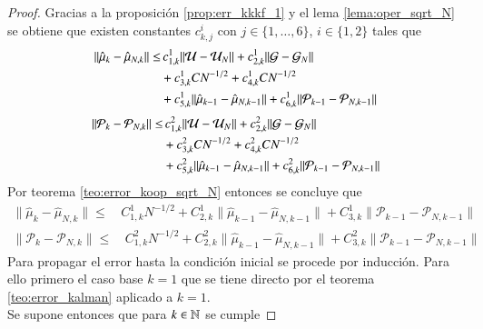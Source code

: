 \begin{proof}
	Gracias a la proposición \ref{prop:err_kkkf_1} y el lema \ref{lema:oper_sqrt_N} se obtiene que existen constantes $c_{k,j}^i$ con $j \in \{ 1, \dots, 6\}$, $i \in \{ 1, 2\}$ tales que
	\begin{equation*}
		\begin{aligned}
			\| \hat \mu_{k} - \hat \mu_{N,k}  \| \leq & \, c_{1,k}^1 \| \mathcal{U} - \mathcal{U}_N \| +  c_{2,k}^1 \| \mathcal{G} - \mathcal{G}_N \| \\ 
			&+ c_{3,k}^1 C N^{-1/2}+c_{4,k}^1 C N^{-1/2} \\
			& + c_{5,k}^1 \| \hat \mu_{k-1} - \hat \mu_{N, k-1} \| + c_{6,k}^1 \| \mathcal{P}_{k-1} - \mathcal{P}_{N, k-1} \|
		\end{aligned}
		\label{}
	\end{equation*}
	\begin{equation*}
		\begin{aligned}
			\| \mathcal{P}_{k} - \mathcal{P}_{N,k} \| \leq & \, c_{1,k}^2 \| \mathcal{U} - \mathcal{U}_N \| +  c_{2,k}^2 \| \mathcal{G} - \mathcal{G}_N \| \\ 
			&+ c_{3,k}^2 C N^{-1/2}+c_{4,k}^2 C N^{-1/2} \\
			& + c_{5,k}^2 \| \hat \mu_{k-1} - \hat \mu_{N, k-1} \| + c_{6,k}^2 \| \mathcal{P}_{k-1} - \mathcal{P}_{N, k-1} \|
		\end{aligned}
	\end{equation*}
	Por teorema \ref{teo:error_koop_sqrt_N} entonces se concluye que
	\begin{equation*}
		\begin{aligned}
			\| \hat \mu_{k} - \hat \mu_{N,k}  \| \leq & \, C_{1,k}^1 N^{-1/2} + C_{2,k}^1 \| \hat \mu_{k-1} - \hat \mu_{N, k-1} \| + C_{3,k}^1 \| \mathcal{P}_{k-1}  - \mathcal{P}_{N, k-1}  \|
		\end{aligned}
	\end{equation*}
	\begin{equation*}
		\begin{aligned}
			\| \mathcal{P}_{k} - \mathcal{P}_{N,k}  \| \leq & \, C_{1,k}^2 N^{-1/2} + C_{2,k}^2 \| \hat \mu_{k-1} - \hat \mu_{N, k-1} \| + C_{3,k}^2 \| \mathcal{P}_{k-1} - \mathcal{P}_{N,k-1} \|
		\end{aligned}
	\end{equation*}
	Para propagar el error hasta la condición inicial se procede por inducción. Para ello primero el caso base $k=1$ que se tiene directo por el teorema \ref{teo:error_kalman} aplicado a $k=1$.\\
	Se supone entonces que para $k \in \mathbb{N}$ se cumple 

\end{proof}
